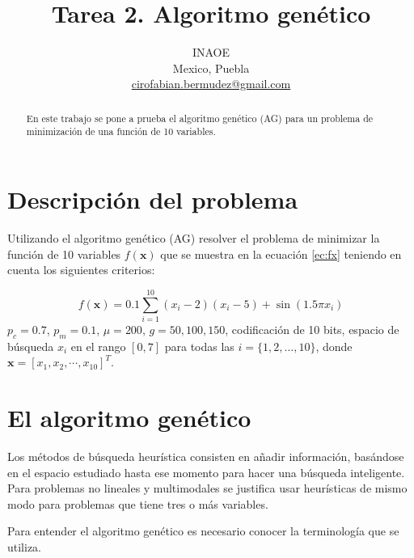 \documentclass[conference]{IEEEtran}
\begin{document}
\title{Tarea 2. Algoritmo genético \\
}

\author{
INAOE\\
Mexico, Puebla \\
\url{cirofabian.bermudez@gmail.com}
}

\maketitle

\begin{abstract}
En este trabajo se pone a prueba el algoritmo genético (AG) para  un problema de minimización de una función de 10 variables.
\end{abstract}


\section{Descripción del problema}

Utilizando el algoritmo genético (AG) resolver el problema de minimizar la función de 10 variables $f(\mathbf{x})$ que se muestra en la ecuación \ref{ec:fx} teniendo en cuenta los siguientes criterios:

\begin{equation}
 f(\mathbf{x}) = 0.1 \sum_{i=1} ^{10} (x_{i} -2)(x_{i} -5) + \sin(1.5 \pi x_{i})
 \label{ec:fx}
 \end{equation} 
$p_{c} = 0.7$, $p_{m} = 0.1$, $\mu =200 $, $g=50, 100, 150$, codificación de 10 bits, espacio de búsqueda $x_{i}$ en el rango $[0,7]$ para todas las $i = \{1, 2, \ldots,10\}$, donde $\mathbf{x} = \left[ x_{1}, x_{2}, \cdots, x_{10} \right]^{T}$.

\section{El algoritmo genético}

Los métodos de búsqueda heurística consisten en añadir información, basándose en el espacio estudiado hasta ese momento para hacer una búsqueda inteligente. Para problemas no lineales y multimodales se justifica usar heurísticas de mismo modo para problemas que tiene tres o más variables.

Para entender el algoritmo genético es necesario conocer la terminología que se utiliza.
 
\end{document}
